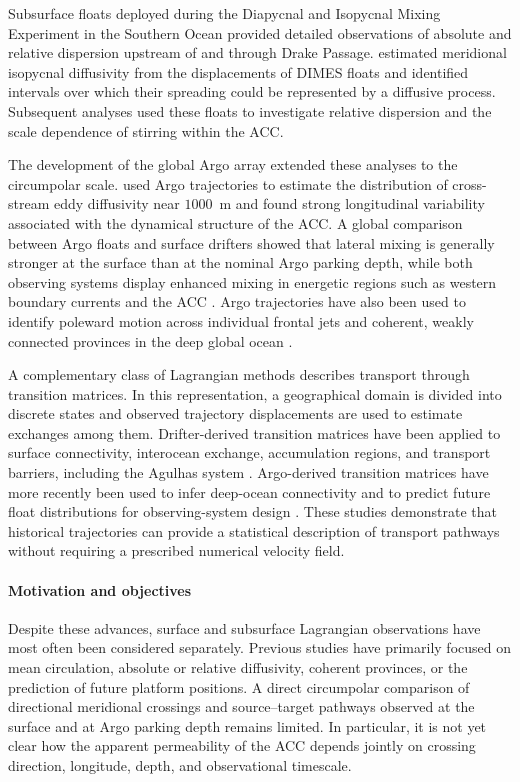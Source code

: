 \documentclass[
  draft
]{agujournal2025}
\begin{document}
        Subsurface floats deployed during the Diapycnal and Isopycnal Mixing Experiment in the Southern Ocean provided detailed observations of absolute and relative dispersion upstream of and through Drake Passage. \cite{art:lacasce2014} estimated meridional isopycnal diffusivity from the displacements of DIMES floats and identified intervals over which their spreading could be represented by a diffusive process. Subsequent analyses used these floats to investigate relative dispersion and the scale dependence of stirring within the ACC.

        The development of the global Argo array extended these analyses to the circumpolar scale. \cite{art:roach2016} used Argo trajectories to estimate the distribution of cross-stream eddy diffusivity near $1000$~m and found strong longitudinal variability associated with the dynamical structure of the ACC. A global comparison between Argo floats and surface drifters showed that lateral mixing is generally stronger at the surface than at the nominal Argo parking depth, while both observing systems display enhanced mixing in energetic regions such as western boundary currents and the ACC \cite{art:roach2018}. Argo trajectories have also been used to identify poleward motion across individual frontal jets \cite{art:li2018} and coherent, weakly connected provinces in the deep global ocean \cite{art:abernathey2022}.

        A complementary class of Lagrangian methods describes transport through transition matrices. In this representation, a geographical domain is divided into discrete states and observed trajectory displacements are used to estimate exchanges among them. Drifter-derived transition matrices have been applied to surface connectivity, interocean exchange, accumulation regions, and transport barriers, including the Agulhas system \cite{art:mcadam2018}. Argo-derived transition matrices have more recently been used to infer deep-ocean connectivity and to predict future float distributions for observing-system design \cite{art:abernathey2022,art:chamberlain2023}. These studies demonstrate that historical trajectories can provide a statistical description of transport pathways without requiring a prescribed numerical velocity field.

    \paragraph{Motivation and objectives}
        Despite these advances, surface and subsurface Lagrangian observations have most often been considered separately. Previous studies have primarily focused on mean circulation, absolute or relative diffusivity, coherent provinces, or the prediction of future platform positions. A direct circumpolar comparison of directional meridional crossings and source--target pathways observed at the surface and at Argo parking depth remains limited. In particular, it is not yet clear how the apparent permeability of the ACC depends jointly on crossing direction, longitude, depth, and observational timescale.
        
\end{document}
